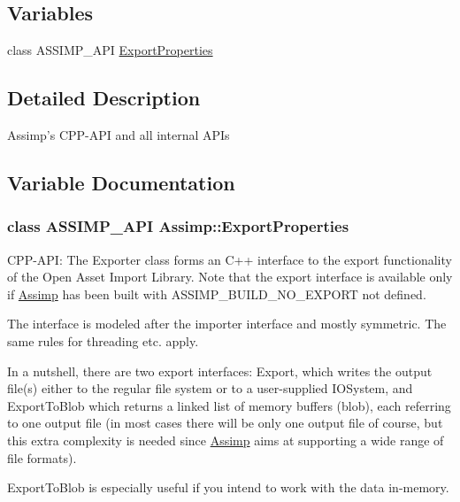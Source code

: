 \subsection*{Variables}
\begin{CompactItemize}
\item 
class ASSIMP\_\-API \hyperlink{namespace_assimp_81d358b0d2907db3ffe185d60f41aa83}{ExportProperties}
\end{CompactItemize}


\subsection{Detailed Description}
Assimp's CPP-API and all internal APIs 

\subsection{Variable Documentation}
\hypertarget{namespace_assimp_81d358b0d2907db3ffe185d60f41aa83}{
\subsubsection[ExportProperties]{\setlength{\rightskip}{0pt plus 5cm}class ASSIMP\_\-API {\bf Assimp::ExportProperties}}}
\label{namespace_assimp_81d358b0d2907db3ffe185d60f41aa83}


CPP-API: The Exporter class forms an C++ interface to the export functionality of the Open Asset Import Library. Note that the export interface is available only if \hyperlink{namespace_assimp}{Assimp} has been built with ASSIMP\_\-BUILD\_\-NO\_\-EXPORT not defined.

The interface is modeled after the importer interface and mostly symmetric. The same rules for threading etc. apply.

In a nutshell, there are two export interfaces: Export, which writes the output file(s) either to the regular file system or to a user-supplied IOSystem, and ExportToBlob which returns a linked list of memory buffers (blob), each referring to one output file (in most cases there will be only one output file of course, but this extra complexity is needed since \hyperlink{namespace_assimp}{Assimp} aims at supporting a wide range of file formats).

ExportToBlob is especially useful if you intend to work with the data in-memory. 